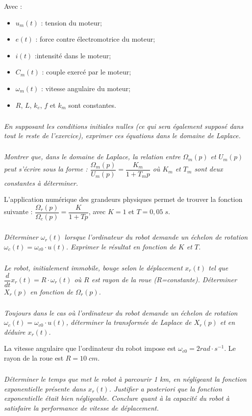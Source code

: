 \documentclass[10pt]{article}
\begin{document}
Avec : 
\begin{itemize}
\item $u_m (t)$ : tension du moteur; 
\item $e(t)$ : force contre électromotrice du moteur; 
\item $i(t)$ :intensité dans le moteur;
\item $C_m (t)$ : couple exercé par le moteur;
\item $\omega_m(t)$ : vitesse angulaire du moteur;
\item $R$, $L$, $k_e$, $f$ et $k_m$ sont constantes.
\end{itemize}

\subparagraph{}
\textit{En supposant les conditions initiales nulles (ce qui sera également supposé dans tout le reste de l'exercice), exprimer ces équations dans le domaine de Laplace. }


\subparagraph{}
\textit{Montrer que, dans le domaine de Laplace, la relation entre $\Omega_m (p)$ et $U_m (p)$ peut s'écrire sous la forme : $\dfrac{\Omega_m(p)}{U_m(p)} = \dfrac{K_m}{1+T_mp} $ où $K_m$ et $T_m$ sont deux constantes à déterminer.}

L'application numérique des grandeurs physiques permet de trouver la fonction suivante : 
$\dfrac{\Omega_r(p)}{\Omega_c(p)}=\dfrac{K}{1+Tp}$, avec $K=1$ et $T=0,05\;s$.



\subparagraph{}
\textit{Déterminer $\omega_r (t)$ lorsque l’ordinateur du robot demande un échelon de rotation $\omega_c (t) = \omega_{c0} \cdot u(t)$. Exprimer le résultat en fonction de $K$ et $T$.}



\subparagraph{}
\textit{Le robot, initialement immobile, bouge selon le déplacement $x_r (t)$ tel que $\dfrac{d}{dt} x_r (t) = R\cdot \omega_r (t)$ où $R$ est rayon de la roue ($R$=constante). Déterminer $X_r (p)$ en fonction de $\Omega_r (p)$.}

\subparagraph{}
\textit{Toujours dans le cas où l'ordinateur du robot demande un échelon de rotation $\omega_c (t) = \omega_{c0}\cdot u(t)$, déterminer la transformée de Laplace de $X_r (p)$ et en déduire $x_r (t)$.} 

La vitesse angulaire que l'ordinateur du robot impose est $\omega_{c0}=2 rad\cdot s^{-1}$. Le rayon de la roue est $R=10\;cm$.  

\subparagraph{}
\textit{Déterminer le temps que met le robot à parcourir 1 km, en négligeant la fonction exponentielle présente dans $x_r (t)$. Justifier a posteriori que la fonction exponentielle était bien négligeable. Conclure quant à la capacité du robot à satisfaire la performance de vitesse de déplacement.}
\end{document}
